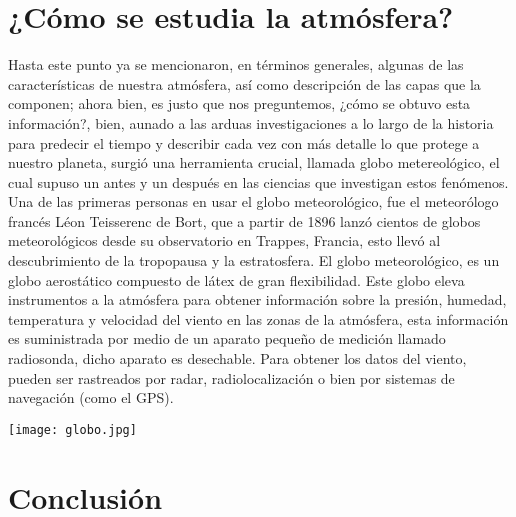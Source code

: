 \documentclass{article}
\begin{document}
\begin{doublespace}
\section{¿Cómo se estudia la atmósfera?}
Hasta este punto ya se mencionaron, en términos generales, algunas de las características de nuestra atmósfera, así como descripción de las capas que la componen; ahora bien, es justo que nos preguntemos, ¿cómo se obtuvo esta información?, bien, aunado a las arduas investigaciones a lo largo de la historia para predecir el tiempo y describir cada vez con más detalle lo que protege a nuestro planeta, surgió una herramienta crucial, llamada globo metereológico, el cual supuso un antes y un después en las ciencias que investigan estos fenómenos. 
\\
Una de las primeras personas en usar el globo meteorológico, fue el meteorólogo francés Léon Teisserenc de Bort, que a partir de 1896 lanzó cientos de globos meteorológicos desde su observatorio en Trappes, Francia, esto llevó al descubrimiento de la tropopausa y la estratosfera. El globo meteorológico, es un globo aerostático compuesto de látex de gran flexibilidad. Este globo eleva instrumentos a la atmósfera para obtener información sobre la presión, humedad, temperatura y velocidad del viento en las zonas de la atmósfera, esta información es suministrada por medio de un aparato pequeño de medición llamado radiosonda, dicho aparato es desechable. Para obtener los datos del viento, pueden ser rastreados por radar, radiolocalización o bien por sistemas de navegación (como el GPS).

\begin{center}
\texttt{[image: globo.jpg]}
\end{center}

\section{Conclusión}


\end{doublespace}
\end{document}
